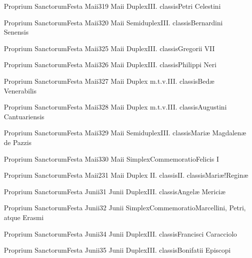 \documentclass[psalterium-feriale.tex]{subfiles}
\begin{document}
	{Proprium Sanctorum}{Festa Maii}{3}{19 Maii}
	{Duplex}{III. classis}{Petri Celestini}
	{}
	{}
\COPObdRubric

	{Proprium Sanctorum}{Festa Maii}{3}{20 Maii}
	{Semiduplex}{III. classis}{Bernardini Senensis}
	{}
	{}
\COPOadRubric

	{Proprium Sanctorum}{Festa Maii}{3}{25 Maii}
	{Duplex}{III. classis}{Gregorii VII}
	{}
	{}
\COPObdRubric

	{Proprium Sanctorum}{Festa Maii}{3}{26 Maii}
	{Duplex}{III. classis}{Philippi Neri}
	{}
	{}
\COPObdRubric

	{Proprium Sanctorum}{Festa Maii}{3}{27 Maii}
	{Duplex m.t.v.}{III. classis}{Bedæ Venerabilis}
	{}
	{}
\COPOcdRubric

	{Proprium Sanctorum}{Festa Maii}{3}{28 Maii}
	{Duplex m.t.v.}{III. classis}{Augustini Cantuariensis}
	{}
	{}
\COPObdRubric

	{Proprium Sanctorum}{Festa Maii}{3}{29 Maii}
	{Semiduplex}{III. classis}{Mariæ Magdalenæ de Pazzis}
	{}
	{}
\MUVNadRubric

	{Proprium Sanctorum}{Festa Maii}{3}{30 Maii}
	{Simplex}{Commemoratio}{Felicis I}
	{}
	{}
\UMEXadRubric

	{Proprium Sanctorum}{Festa Maii}{2}{31 Maii}
	{Duplex II. classis}{II. classis}{Mariæ!Reginæ}
	{}
	{}
\psalmodiapropria

	{Proprium Sanctorum}{Festa Junii}{3}{1 Junii}
	{Duplex}{III. classis}{Angelæ Mericiæ}
	{}
	{}
\MUVNbdRubric

	{Proprium Sanctorum}{Festa Junii}{3}{2 Junii}
	{Simplex}{Commemoratio}{Marcellini, Petri, atque Erasmi\linebreak\null}
	{}
	{}
\PMEXadRubric

	{Proprium Sanctorum}{Festa Junii}{3}{4 Junii}
	{Duplex}{III. classis}{Francisci Caracciolo}
	{}
	{}
\COPObdRubric

	{Proprium Sanctorum}{Festa Junii}{3}{5 Junii}
	{Duplex}{III. classis}{Bonifatii Episcopi}
	{}
	{}
\UMEXbdRubric
\end{document}
